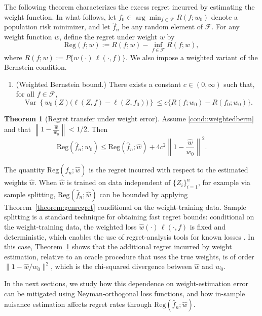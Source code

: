 \documentclass[11pt]{article}
\newcommand{\Reg}{\mathrm{Reg}}
\theoremstyle{plain}
\theoremstyle{definition} %
\newtheorem{theorem}{Theorem}
\newcommand{\Var}{\operatorname{Var}}
\begin{document}
The following theorem characterizes the excess regret incurred by estimating
the weight function. In what follows, let
\(f_0 \in \arg\min_{f\in\mathcal F} R(f;w_0)\) denote a population risk
minimizer, and let \(\hat f_n\) be any random element of \(\mathcal F\). For
any weight function \(w\), define the regret under weight \(w\) by
\[
\Reg(f;w) := R(f;w) - \inf_{f\in\mathcal F} R(f;w),
\]
where $R(f;w) := P\{w(\cdot)\,\ell(\cdot,f)\}.$
We also impose a weighted variant of the Bernstein condition.

\begin{enumerate}[label=\bfseries B\arabic*), ref={B\arabic*}, series=nuis]
    \item \label{cond::weightedberm} (Weighted Bernstein bound.) There exists a constant $c \in (0,\infty)$ such that, for all $f \in \mathcal{F}$,
\[
\Var\left\{w_0(Z)\bigl(\ell(Z,f)-\ell(Z,f_0)\bigr)\right\}
\le
c\bigl\{R(f;w_0)-R(f_0;w_0)\bigr\}.
\]
\end{enumerate}

\begin{theorem}[Regret transfer under weight error]
\label{theorem:weightedERM}
Assume \ref{cond::weightedberm} and that $\left\|1-\frac{\hat w}{w_0}\right\| < 1/2$. Then
\[
\Reg(\hat f_n; w_0)
\le
\Reg(\hat f_n;\hat w)
+
4c^2\left\|1-\frac{\hat w}{w_0}\right\|^2.
\]
\end{theorem}

The quantity \(\Reg(\hat f_n;\hat w)\) is the regret incurred with respect to the
estimated weights \(\hat w\). When \(\hat w\) is trained on data independent of
\(\{Z_i\}_{i=1}^n\), for example via sample splitting, \(\Reg(\hat f_n;\hat w)\)
can be bounded by applying Theorem~\ref{theorem:genregret} conditional on the
weight-training data. Sample splitting is a standard technique for obtaining
fast regret bounds: conditional on the weight-training data, the weighted loss
\(\hat w(\cdot)\,\ell(\cdot,f)\) is fixed and deterministic, which enables the
use of regret-analysis tools for known losses \citep{foster2023orthogonal}. In
this case, Theorem~\ref{theorem:weightedERM} shows that the additional regret
incurred by weight estimation, relative to an oracle procedure that uses the
true weights, is of order \(\|1-\hat w/w_0\|^2\), which is the chi-squared
divergence between \(\hat w\) and \(w_0\).  




In the next sections, we study how this dependence on weight-estimation error can be mitigated using Neyman-orthogonal loss functions, and how in-sample nuisance estimation affects regret rates through $\Reg(\hat f_n;\hat w)$.  
\end{document}
